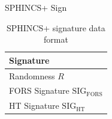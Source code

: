 \documentclass [version=submission]{iacrcc}
\begin{document}
\begin{subsection}{SPHINCS+ Sign}
\begin{table}[ht]
  \centering
  \begin{tabular}{|l|}
    \hline
    \textbf{Signature}                         \\ \hline
    Randomness \(R\)                         \\ \hline
    FORS Signature \(\mathrm{SIG}_{\mathrm{FORS}}\)        \\ \hline
    HT Signature \(\mathrm{SIG}_{\mathrm{HT}}\)        \\ \hline
  \end{tabular}
  \caption{SPHINCS+ signature data format}
  \label{tab:slh-dsa-format}
\end{table}



\end{subsection}
\end{document}
